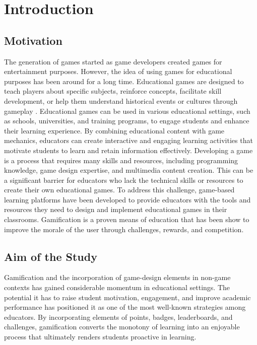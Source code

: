 \chapter{Introduction}\label{chap:intro}

\section{Motivation}
The generation of games started as game developers created games for entertainment purposes. However, the idea of using games for educational purposes has been around for a long time. Educational games are designed to teach players about specific subjects, reinforce concepts, facilitate skill development, or help them understand historical events or cultures through gameplay \cite{crawford1982art}. Educational games can be used in various educational settings, such as schools, universities, and training programs, to engage students and enhance their learning experience. By combining educational content with game mechanics, educators can create interactive and engaging learning activities that motivate students to learn and retain information effectively. Developing a game is a process that requires many skills and resources, including programming knowledge, game design expertise, and multimedia content creation. This can be a significant barrier for educators who lack the technical skills or resources to create their own educational games. To address this challenge, game-based learning platforms have been developed to provide educators with the tools and resources they need to design and implement educational games in their classrooms. Gamification is a proven means of education that has been show to improve the morale of the user through challenges, rewards, and competition. 

\section{Aim of the Study}
Gamification and the incorporation of game-design elements in non-game contexts has gained considerable momentum in educational settings. The potential it has to raise student motivation, engagement, and improve academic performance has positioned it as one of the most well-known strategies among educators. By incorporating elements of points, badges, leaderboards, and challenges, gamification converts the monotony of learning into an enjoyable process that ultimately renders students proactive in learning.

